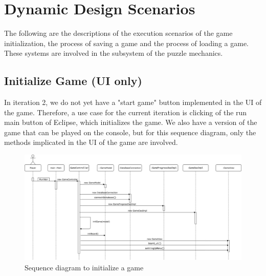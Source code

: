 \documentclass[12pt]{article}
\begin{document}
\newpage

\section{Dynamic Design Scenarios}
The following are the descriptions of the execution scenarios of the game initialization, the process of saving a game and the process of loading a game. These systems are involved in the subsystem of the puzzle mechanics.

\subsection{Initialize Game (UI only)}

In iteration 2, we do not yet have a "start game" button implemented in the UI of the game. Therefore, a use case for the current iteration is clicking of the run main button of Eclipse, which initializes the game. We also have a version of the game that can be played on the console, but for this sequence diagram, only the methods implicated in the UI of the game are involved. 
\begin{figure}[htbp]
    \includegraphics[width=1\textwidth]{initGame}
    \caption{Sequence diagram to initialize a game}
    \label{fig:sequenceDiagram}
\end{figure}

\newpage
\end{document}
